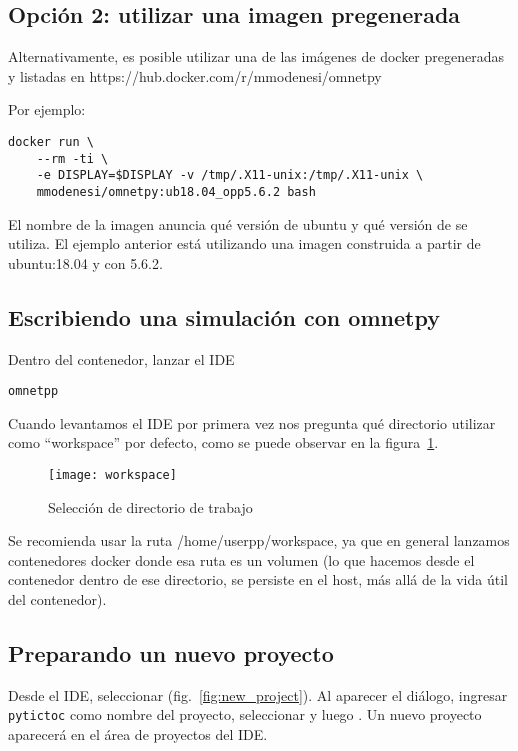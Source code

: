 \subsection{Opción 2: utilizar una imagen pregenerada}

Alternativamente, es posible utilizar una de las imágenes de docker
pregeneradas y listadas en https://hub.docker.com/r/mmodenesi/omnetpy

Por ejemplo:

\begin{verbatim}
docker run \
    --rm -ti \
    -e DISPLAY=$DISPLAY -v /tmp/.X11-unix:/tmp/.X11-unix \    
    mmodenesi/omnetpy:ub18.04_opp5.6.2 bash
\end{verbatim}

El nombre de la imagen anuncia qué versión de ubuntu y qué versión de \omnetpp{}
se utiliza. El ejemplo anterior está utilizando una imagen construida a partir
de ubuntu:18.04 y con \omnetpp{} 5.6.2.

\subsection{Escribiendo una simulación con omnetpy}

Dentro del contenedor, lanzar el IDE

\begin{verbatim}
omnetpp
\end{verbatim}

Cuando levantamos el IDE por primera vez nos pregunta qué directorio
utilizar como ``workspace'' por defecto, como se puede observar en la
figura~\ref{fig:workspace}.

\begin{figure}[h]
\caption{Selección de directorio de trabajo}
\label{fig:workspace}
\centering
\texttt{[image: workspace]}
\end{figure}

Se recomienda usar la ruta /home/userpp/workspace, ya que en general lanzamos
contenedores docker donde esa ruta es un volumen (lo que hacemos desde el
contenedor dentro de ese directorio, se persiste en el host, más allá de la
vida útil del contenedor).

\subsection{Preparando un nuevo proyecto}

Desde el IDE, seleccionar \ui{File $\rightarrow$ New $\rightarrow$ OMNeT++
Project} (fig.~\ref{fig:new_project}). Al aparecer el diálogo, ingresar
\verb!pytictoc! como nombre del proyecto, seleccionar  y
luego \ui{Finish}. Un nuevo proyecto aparecerá en el área de proyectos del IDE.


